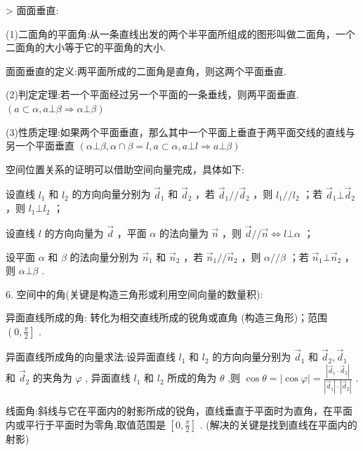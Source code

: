 > 面面垂直:

(1)二面角的平面角:从一条直线出发的两个半平面所组成的图形叫做二面角，一个二面角的大小等于它的平面角的大小.

面面垂直的定义:两平面所成的二面角是直角，则这两个平面垂直.

(2)判定定理:若一个平面经过另一个平面的一条垂线，则两平面垂直. $\left( {a \subset  \alpha ,a\bot \beta  \Rightarrow  \alpha \bot \beta }\right)$

(3)性质定理:如果两个平面垂直，那么其中一个平面上垂直于两平面交线的直线与另一个平面垂直 $\left( {\alpha  \bot  \beta ,\alpha  \cap  \beta  = l,a \subset  \alpha ,a \bot  l \Rightarrow  a \bot  \beta }\right)$

  空间位置关系的证明可以借助空间向量完成，具体如下:

  设直线 ${l}_{1}$ 和 ${l}_{2}$ 的方向向量分别为 ${\overrightarrow{d}}_{1}$ 和 ${\overrightarrow{d}}_{2}$ ，若 ${\overrightarrow{d}}_{1}//{\overrightarrow{d}}_{2}$ ，则 ${l}_{1}//{l}_{2}$ ；若 ${\overrightarrow{d}}_{1}\bot {\overrightarrow{d}}_{2}$ ，则 ${l}_{1}\bot {l}_{2}$ ；

  设直线 $l$ 的方向向量为 $\overrightarrow{d}$ ，平面 $\alpha$ 的法向量为 $\overrightarrow{n}$ ，则 $\overrightarrow{d}//\overrightarrow{n} \Leftrightarrow  l\bot \alpha$ ；

  设平面 $\alpha$ 和 $\beta$ 的法向量分别为 ${\overrightarrow{n}}_{1}$ 和 ${\overrightarrow{n}}_{2}$ ，若 ${\overrightarrow{n}}_{1}//{\overrightarrow{n}}_{2}$ ，则 $\alpha //\beta$ ；若 ${\overrightarrow{n}}_{1}\bot {\overrightarrow{n}}_{2}$ ，则 $\alpha \bot \beta$ .

6. 空间中的角(关键是构造三角形或利用空间向量的数量积):

异面直线所成的角: 转化为相交直线所成的锐角或直角 (构造三角形)；范围 $\left( {0,\frac{\pi }{2}}\right\rbrack$ .

  异面直线所成角的向量求法:设异面直线 ${l}_{1}$ 和 ${l}_{2}$ 的方向向量分别为 ${\overrightarrow{d}}_{1}$ 和 ${\overrightarrow{d}}_{2},{\overrightarrow{d}}_{1}$ 和 ${\overrightarrow{d}}_{2}$ 的夹角为 $\varphi$ , 异面直线 ${l}_{1}$ 和 ${l}_{2}$ 所成的角为 $\theta$ ,则 $\cos \theta  = \left| {\cos \varphi }\right|  = \frac{\left| {\overrightarrow{d}}_{1} \cdot  {\overrightarrow{d}}_{2}\right| }{\left| {\overrightarrow{d}}_{1}\right|  \cdot  \left| {\overrightarrow{d}}_{2}\right| }$ .

线面角:斜线与它在平面内的射影所成的锐角，直线垂直于平面时为直角，在平面内或平行于平面时为零角,取值范围是 $\left\lbrack  {0,\frac{\pi }{2}}\right\rbrack$ . (解决的关键是找到直线在平面内的射影)

